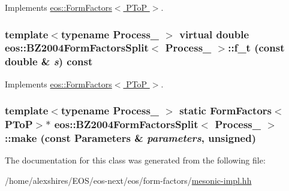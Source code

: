 Implements \hyperlink{classeos_1_1FormFactors_3_01PToP_01_4_a987757eb4559de496005ed2730e78a10}{eos::FormFactors$<$ PToP $>$}.\hypertarget{classeos_1_1BZ2004FormFactorsSplit_a395cb136ff1d486d5a0b0a2c0d5f7d10}{
\subsubsection[{f\_\-t}]{\setlength{\rightskip}{0pt plus 5cm}template$<$typename Process\_\- $>$ virtual double {\bf eos::BZ2004FormFactorsSplit}$<$ Process\_\- $>$::f\_\-t (const double \& {\em s}) const}}
\label{classeos_1_1BZ2004FormFactorsSplit_a395cb136ff1d486d5a0b0a2c0d5f7d10}


Implements \hyperlink{classeos_1_1FormFactors_3_01PToP_01_4_ae753d67d42936bd32b043838e7fb769a}{eos::FormFactors$<$ PToP $>$}.\hypertarget{classeos_1_1BZ2004FormFactorsSplit_a84eed9e4957fc8fedcb5f116abf40838}{
\subsubsection[{make}]{\setlength{\rightskip}{0pt plus 5cm}template$<$typename Process\_\- $>$ static FormFactors$<${\bf PToP}$>$$\ast$ {\bf eos::BZ2004FormFactorsSplit}$<$ Process\_\- $>$::make (const {\bf Parameters} \& {\em parameters}, \/  unsigned)}}
\label{classeos_1_1BZ2004FormFactorsSplit_a84eed9e4957fc8fedcb5f116abf40838}


The documentation for this class was generated from the following file:\begin{DoxyCompactItemize}
\item 
/home/alexshires/EOS/eos-\/next/eos/form-\/factors/\hyperlink{mesonic-impl_8hh}{mesonic-\/impl.hh}\end{DoxyCompactItemize}
